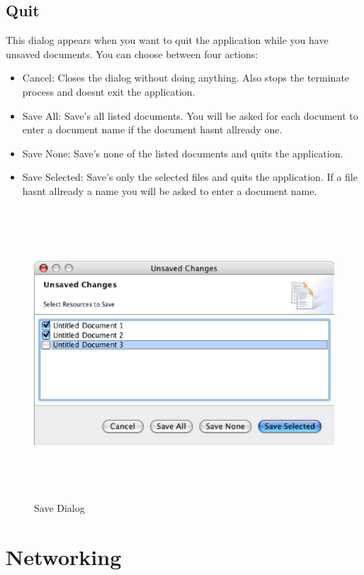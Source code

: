 \documentclass[11pt,a4paper]{article}
\begin{document}
\subsection{Quit}
This dialog appears when you want to quit the application while you have unsaved documents. You can choose between four actions:
\begin{itemize}
\item Cancel: Closes the dialog without doing anything. Also stops the terminate process and doesnt exit the application.
\item Save All: Save's all listed documents. You will be asked for each document to enter a document name if the document hasnt allready one.
\item Save None: Save's none of the listed documents and quits the application.
\item Save Selected: Save's only the selected files and quits the application. If a file hasnt allready a name you will be asked to enter a document name.
\end{itemize}


\begin{figure}[H]
\begin{center}
  \includegraphics[height=4.26in, width=6.96in]{../images/usermanual/ace_savedialog.eps}
\caption{Save Dialog}
\label{dialog_quit_save}
\end{center}
\end{figure}




\newpage
\section{Networking}
\label{sect_networking}
\end{document}
